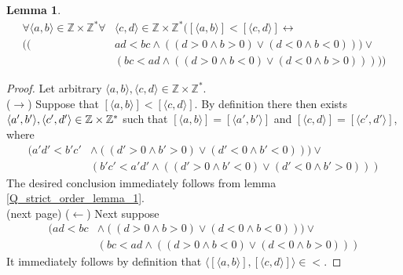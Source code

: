 \documentclass{report}
\newtheorem{lemma}[theo]{Lemma}
\begin{document}
\begin{lemma}\label{Q_strict_order_lemma_2}
\begin{align*}
\forall\langle a,b\rangle\in\mathbb Z\times\mathbb Z^*\forall&\langle c,d\rangle\in\mathbb Z\times\mathbb Z^*([\langle a,b\rangle]<[\langle c,d\rangle]\leftrightarrow\\
((&ad<bc\land((d>0\land b>0)\lor(d<0\land b<0)))\lor\\
&(bc<ad\land((d>0\land b<0)\lor(d<0\land b>0)))))
\end{align*}
\end{lemma}
\begin{proof}
Let arbitrary $\langle a,b\rangle,\langle c,d\rangle\in\mathbb Z\times\mathbb Z^*$.\\
\indent($\rightarrow$) Suppose that $[\langle a,b\rangle]<[\langle c,d\rangle]$. By definition there then exists $\langle a',b'\rangle,\\\langle c',d'\rangle\in\mathbb Z\times\mathbb Z^*$ such that
$[\langle a,b\rangle]=[\langle a',b'\rangle]$ and $[\langle c,d\rangle]=[\langle c',d'\rangle]$, where
\begin{align*}
(a'd'<b'c'&\land((d'>0\land b'>0)\lor(d'<0\land b'<0)))\lor\\
&(b'c'<a'd'\land((d'>0\land b'<0)\lor(d'<0\land b'>0)))
\end{align*}
The desired conclusion immediately follows from lemma \ref{Q_strict_order_lemma_1}.\\
(next page)\newpage
($\leftarrow$) Next suppose 
\begin{align*}
(ad<bc&\land((d>0\land b>0)\lor(d<0\land b<0)))\lor\\
&(bc<ad\land((d>0\land b<0)\lor(d<0\land b>0)))
\end{align*}
It immediately follows by definition that $\langle[\langle a,b\rangle],[\langle c,d\rangle]\rangle\in<$.
\end{proof}
\end{document}
